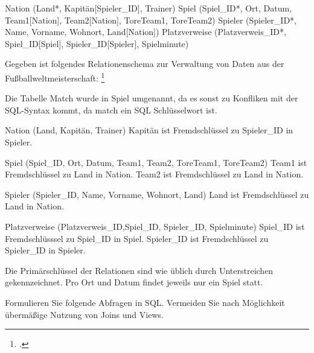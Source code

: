 \documentclass{lehramt-informatik-aufgabe}
\begin{document}

\begin{liRelationenSchemaFormat}
Nation (Land*, Kapitän[Spieler_ID], Trainer)
Spiel (Spiel_ID*, Ort, Datum, Team1[Nation], Team2[Nation], ToreTeam1, ToreTeam2)
Spieler (Spieler_ID*, Name, Vorname, Wohnort, Land[Nation])
Platzverweise (Platzverweis_ID*, Spiel_ID[Spiel], Spieler_ID[Spieler], Spielminute)
\end{liRelationenSchemaFormat}

Gegeben ist folgendes Relationenschema zur Verwaltung von Daten aus der
Fußballweltmeisterschaft:
\footcite{examen:66116:2021:03}

Die Tabelle Match wurde in Spiel umgenannt, da es sonst zu Konfliken mit
der SQL-Syntax kommt, da match ein SQL Schlüsselwort ist.

Nation (Land, Kapitän, Trainer)
Kapitän ist Fremdschlüssel zu Spieler\_ID in Spieler.

Spiel (Spiel\_ID, Ort, Datum, Team1, Team2, ToreTeam1, ToreTeam2)
Team1 ist Fremdschlüssel zu Land in Nation.
Team2 ist Fremdschlüssel zu Land in Nation.

Spieler (Spieler\_ID, Name, Vorname, Wohnort, Land)
Land ist Fremdschlüssel zu Land in Nation.

Platzverweise (Platzverweis\_ID,Spiel\_ID, Spieler\_ID, Spielminute)
Spiel\_ID ist Fremdschlüsssel zu Spiel\_ID in Spiel.
Spieler\_ID ist Fremdschlüssel zu Spieler\_ID in Spieler.

Die Primärschlüssel der Relationen sind wie üblich durch Unterstreichen
gekennzeichnet. Pro Ort und Datum findet jeweils nur ein Spiel statt.

Formulieren Sie folgende Abfragen in SQL. Vermeiden Sie nach Möglichkeit
übermäßige Nutzung von Joins und Views.
\end{document}
